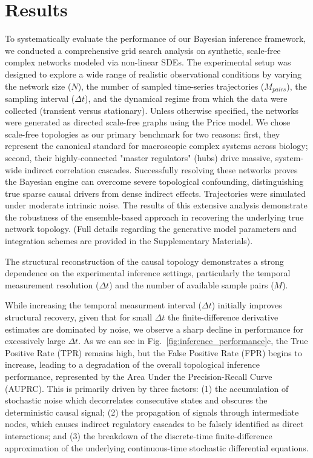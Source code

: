 \documentclass[10pt, aps, rmp,  twocolumn, superscriptaddress, floatfix, showkeys]{revtex4-2}
\begin{document}
\section{Results}

To systematically evaluate the performance of our Bayesian inference framework, we conducted a comprehensive grid search analysis on synthetic, scale-free complex networks modeled via non-linear SDEs. The experimental setup was designed to explore a wide range of realistic observational conditions by varying the network size ($N$), the number of sampled time-series trajectories ($M_{pairs}$), the sampling interval ($\Delta t$), and the dynamical regime from which the data were collected (transient versus stationary). Unless otherwise specified, the networks were generated as directed scale-free graphs using the Price model. We chose scale-free topologies as our primary benchmark for two reasons: first, they represent the canonical standard for macroscopic complex systems across biology; second, their highly-connected "master regulators" (hubs) drive massive, system-wide indirect correlation cascades. Successfully resolving these networks proves the Bayesian engine can overcome severe topological confounding, distinguishing true sparse causal drivers from dense indirect effects. Trajectories were simulated under moderate intrinsic noise. The results of this extensive analysis demonstrate the robustness of the ensemble-based approach in recovering the underlying true network topology. (Full details regarding the generative model parameters and integration schemes are provided in the Supplementary Materials).

The structural reconstruction of the causal topology demonstrates a strong dependence on the experimental inference settings, particularly the temporal measurement resolution ($\Delta t$) and the number of available sample pairs ($M$).

While increasing the temporal measurment interval ($\Delta t$) initially improves structural recovery, given that for small $\Delta t$ the finite-difference derivative estimates are dominated by noise, we observe a sharp decline in performance for excessively large $\Delta t$. As we can see in Fig.~\ref{fig:inference_performance}c, the True Positive Rate (TPR) remains high, but the False Positive Rate (FPR) begins to increase, leading to a degradation of the overall topological inference performance, represented by the Area Under the Precision-Recall Curve (AUPRC). This is primarily driven by three factors: (1) the accumulation of stochastic noise which decorrelates consecutive states and obscures the deterministic causal signal; (2) the propagation of signals through intermediate nodes, which causes indirect regulatory cascades to be falsely identified as direct interactions; and (3) the breakdown of the discrete-time finite-difference approximation of the underlying continuous-time stochastic differential equations.
\end{document}
